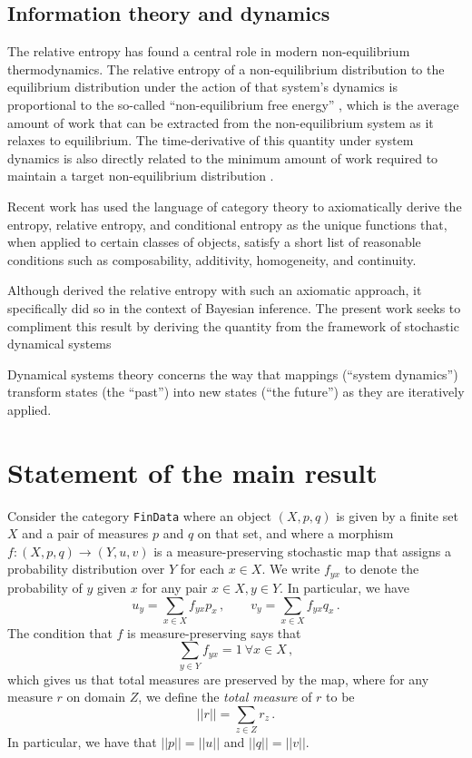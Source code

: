 \documentclass{article}
\begin{document}
\subsection{Information theory and dynamics}

The relative entropy has found a central role in modern non-equilibrium thermodynamics. The relative entropy of a non-equilibrium distribution to the equilibrium distribution under the action of that system's dynamics is proportional to the so-called ``non-equilibrium free energy'' \cite{gaveauGeneralFrameworkNonequilibrium1997, shawDrippingFaucetModel1984}, which is the average amount of work that can be extracted from the non-equilibrium system as it relaxes to equilibrium. The time-derivative of this quantity under system dynamics is also directly related to the minimum amount of work required to maintain a target non-equilibrium distribution \cite{horowitzMinimumEnergeticCost2017}.

Recent work \cite{baezCharacterizationEntropyTerms2011, baezBayesianCharacterizationRelative2014, fullwoodInformationLossStochastic2021} has used the language of category theory to axiomatically derive the entropy, relative entropy, and conditional entropy as the unique functions that, when applied to certain classes of objects, satisfy a short list of reasonable conditions such as composability, additivity, homogeneity, and continuity.

Although \cite{baezBayesianCharacterizationRelative2014} derived the relative entropy with such an axiomatic approach, it specifically did so in the context of Bayesian inference. The present work seeks to compliment this result by deriving the quantity from the framework of stochastic dynamical systems

Dynamical systems theory concerns the way that mappings (``system dynamics'') transform states (the ``past'') into new states (``the future'') as they are iteratively applied. 

\section{Statement of the main result}
Consider the category \texttt{FinData} where an object $(X, p, q)$ is given by a finite set $X$ and a pair of measures $p$ and $q$ on that set, and where a morphism $f:(X, p, q) \rightarrow (Y, u, v)$ is a measure-preserving stochastic map that assigns a probability distribution over $Y$ for each $x\in X$. We write $f_{yx}$ to denote the probability of $y$ given $x$ for any pair $x\in X, y\in Y$. In particular, we have
$$
u_y = \sum_{x\in X} f_{yx}p_x\,,
\qquad v_y = \sum_{x\in X} f_{yx}q_x\,.
$$
The condition that $f$ is measure-preserving says that 
$$
    \sum_{y\in Y} f_{yx} = 1 \ \forall x\in X\,,
$$
which gives us that total measures are preserved by the map, where for any measure $r$ on domain $Z$, we define the \textit{total measure} of $r$ to be
$$
||r|| = \sum_{z\in Z} r_z\,.
$$
In particular, we have that $||p|| = ||u||$ and $||q|| = ||v||$.
\end{document}
